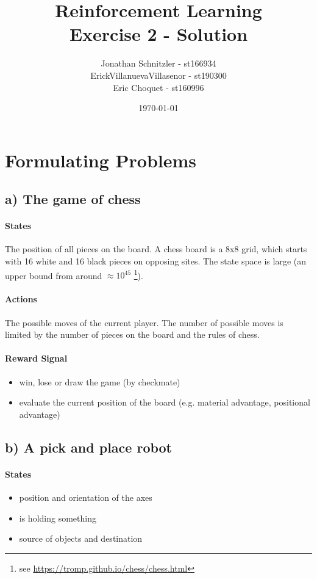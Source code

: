 \documentclass{article}
\title{Reinforcement Learning \\ Exercise 2 - Solution}
\author{Jonathan Schnitzler - st166934 \\
ErickVillanuevaVillasenor - st190300 \\
Eric Choquet - st160996}
\date{\today}
\begin{document}
\maketitle




\section{Formulating Problems}

\subsection*{a) The game of chess}

\paragraph*{States}
The position of all pieces on the board. A chess board is a 8x8 grid, which starts with 16 white and 16 black pieces on opposing sites. The state space is large (an upper bound from around $\approx 10^{45}$ \footnote{see \url{https://tromp.github.io/chess/chess.html}}).

\paragraph*{Actions}
The possible moves of the current player. The number of possible moves is limited by the number of pieces on the board and the rules of chess.

\paragraph*{Reward Signal}
\begin{itemize}
    \item win, lose or draw the game (by checkmate)
    \item evaluate the current position of the board (e.g. material advantage, positional advantage)
\end{itemize}




\subsection*{b) A pick and place robot}

\paragraph*{States}
\begin{itemize}
    \item position and orientation of the axes
    \item is holding something
    \item source of objects and destination
\end{itemize}
\end{document}
